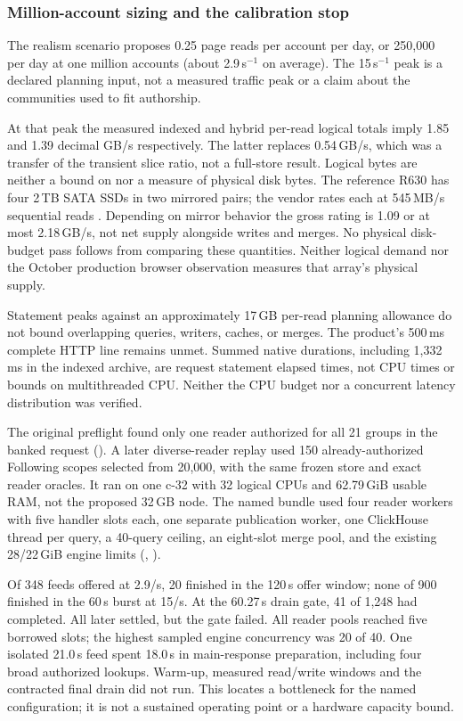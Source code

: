 \subsubsection{Million-account sizing and the calibration stop}
\label{sec:budget}

The realism scenario proposes 0.25 page reads per account per day, or
250,000 per day at one million accounts (about 2.9\,s$^{-1}$ on average).
The 15\,s$^{-1}$ peak is a declared planning input, not a measured traffic
peak or a claim about the communities used to fit authorship.

At that peak the measured indexed and hybrid per-read logical totals imply
1.85 and 1.39 decimal GB/s respectively. The latter replaces 0.54\,GB/s,
which was a transfer of the transient slice ratio, not a full-store result.
Logical bytes are neither a bound on nor a measure of physical disk bytes.
The reference R630 has four 2\,TB SATA SSDs in two mirrored pairs; the
vendor rates each at 545\,MB/s sequential reads \cite{sandisk}. Depending
on mirror behavior the gross rating is 1.09 or at most 2.18\,GB/s, not net
supply alongside writes and merges. No physical disk-budget pass follows
from comparing these quantities. Neither logical demand nor the October
production browser observation measures that array's physical supply.

Statement peaks against an approximately 17\,GB per-read planning allowance
do not bound overlapping queries, writers, caches, or merges. The product's
500\,ms complete HTTP line remains unmet. Summed native durations, including
1,332\,ms in the indexed archive, are request statement elapsed times, not
CPU times or bounds on multithreaded CPU. Neither the CPU budget nor a
concurrent latency distribution was verified.

The original preflight found only one reader authorized for all 21 groups
in the banked request (). A later diverse-reader replay used
150 already-authorized Following scopes selected from 20,000, with the
same frozen store and exact reader oracles. It ran on one c-32 with 32
logical CPUs and 62.79\,GiB usable RAM, not the proposed 32\,GB node.
The named bundle used four reader workers with five handler slots each,
one separate publication worker, one ClickHouse thread per query,
a 40-query ceiling, an eight-slot merge pool, and the existing 28/22\,GiB
engine limits (, ).

Of 348 feeds offered at 2.9/s, 20 finished in the 120\,s offer window;
none of 900 finished in the 60\,s burst at 15/s. At the 60.27\,s drain
gate, 41 of 1,248 had completed. All later settled, but the gate failed.
All reader pools reached five borrowed slots; the highest sampled
engine concurrency was 20 of 40. One isolated 21.0\,s feed spent
18.0\,s in main-response preparation, including four broad authorized
lookups. Warm-up, measured read/write windows and the contracted final
drain did not run. This locates a bottleneck for the named configuration;
it is not a sustained operating point or a hardware capacity bound.
